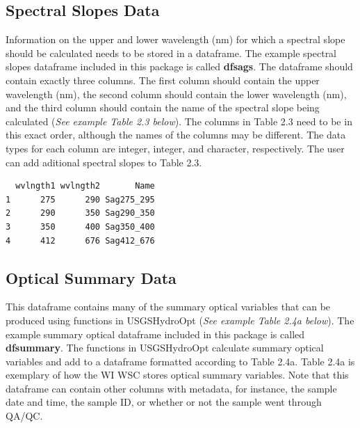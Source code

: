 \documentclass[a4paper,11pt]{article}\usepackage[]{graphicx}\usepackage[]{color}
\makeatletter
\newenvironment{kframe}{%
 \def\at@end@of@kframe{}%
 \ifinner\ifhmode%
  \def\at@end@of@kframe{\end{minipage}}%
  \begin{minipage}{\columnwidth}%
 \fi\fi%
 \def\FrameCommand##1{\hskip\@totalleftmargin \hskip-\fboxsep
 \colorbox{shadecolor}{##1}\hskip-\fboxsep
     \hskip-\linewidth \hskip-\@totalleftmargin \hskip\columnwidth}%
 \MakeFramed {\advance\hsize-\width
   \@totalleftmargin\z@ \linewidth\hsize
   \@setminipage}}%
 {\par\unskip\endMakeFramed%
 \at@end@of@kframe}
\newenvironment{knitrout}{}{} %
\makeatother
\begin{document}
\subsection{Spectral Slopes Data}
Information on the upper and lower wavelength (nm) for which a spectral slope should be calculated needs to be stored in a dataframe. The example spectral slopes dataframe included in this package is called \textbf{dfsags}. The dataframe should contain exactly three columns. The first column should contain the upper wavelength (nm), the second column should contain the lower wavelength (nm), and the third column should contain the name of the spectral slope being calculated (\emph{See example Table 2.3 below}). The columns in Table 2.3 need to be in this exact order, although the names of the columns may be different. The data types for each column are integer, integer, and character, respectively. The user can add aditional spectral slopes to Table 2.3.

\begin{knitrout}
\color{fgcolor}\begin{kframe}
\begin{verbatim}
  wvlngth1 wvlngth2       Name
1      275      290 Sag275_295
2      290      350 Sag290_350
3      350      400 Sag350_400
4      412      676 Sag412_676
\end{verbatim}
\end{kframe}
\end{knitrout}

\subsection{Optical Summary Data}
This dataframe contains many of the summary optical variables that can be produced using functions in USGSHydroOpt (\emph{See example Table 2.4a below}). The example summary optical dataframe included in this package is called \textbf{dfsummary}. The functions in USGSHydroOpt calculate summary optical variables and add to a dataframe formatted according to Table 2.4a. Table 2.4a is exemplary of how the WI WSC stores optical summary variables. Note that this dataframe can contain other columns with metadata, for instance, the sample date and time, the sample ID, or whether or not the sample went through QA/QC.
\end{document}
